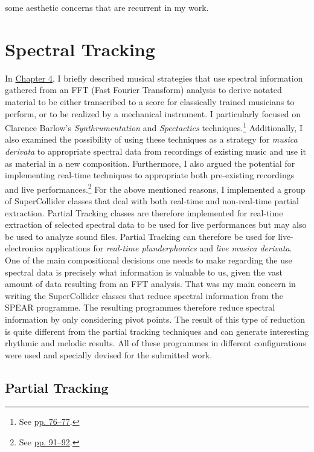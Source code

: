 some aesthetic concerns that are recurrent in my work.

\section{Spectral Tracking}

In \hyperlink{chapter4}{Chapter 4}, I briefly described musical strategies that use spectral information gathered from an FFT (Fast Fourier Transform) analysis to derive notated material to be either transcribed to a score for classically trained musicians to perform, or to be realized by a mechanical instrument. I particularly focused on Clarence Barlow's \emph{Synthrumentation} and \emph{Spectactics} techniques.\footnote{See \hyperlink{spectactics}{pp. 76--77}.} Additionally, I also examined the possibility of using these techniques as a strategy for \emph{musica derivata} to appropriate spectral data from recordings of existing music and use it as material in a new composition. Furthermore, I also argued the potential for implementing real-time techniques to appropriate both pre-existing recordings and live performances.\footnote{See \hyperlink{realtimeplunderfuck}{pp. 91--92}.} For the above mentioned reasons, I implemented a group of SuperCollider classes that deal with both real-time and non-real-time partial extraction. Partial Tracking classes are therefore implemented for real-time extraction of selected spectral data to be used for live performances but may also be used to analyze sound files. Partial Tracking can therefore be used for live-electronics applications for \emph{real-time plunderphonics} and \emph{live musica derivata}. One of the main compositional decisions one needs to make regarding the use spectral data is precisely what information is valuable to us, given the vast amount of data resulting from an FFT analysis. That was my main concern in writing the SuperCollider classes that reduce spectral information from the SPEAR programme. The resulting programmes therefore reduce spectral information by only considering pivot points. The result of this type of reduction is quite different from the partial tracking techniques and can generate interesting rhythmic and melodic results. All of these programmes in different configurations were used and specially devised for the submitted work. 

\subsection{Partial Tracking}

